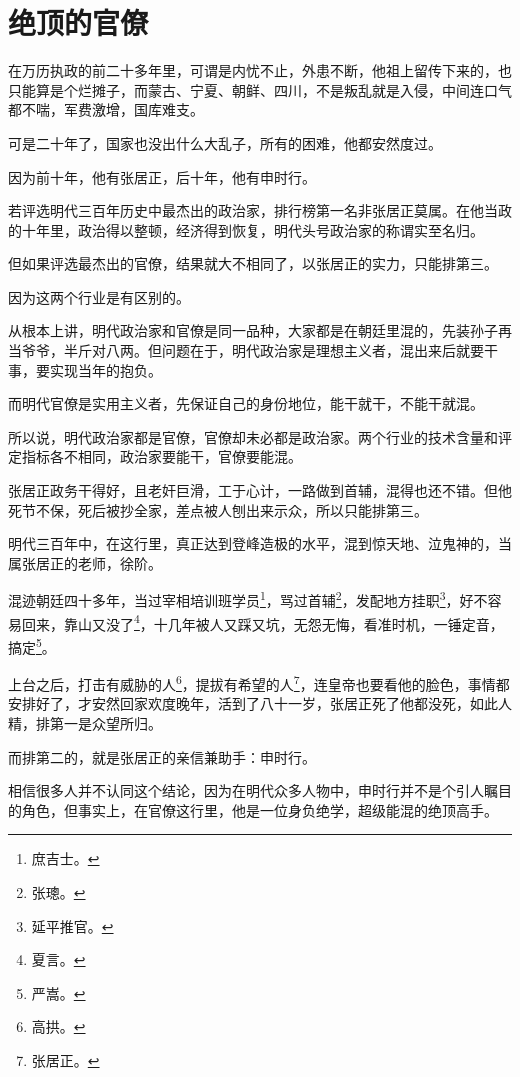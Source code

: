 \section{绝顶的官僚}
\ifnum{}
	\begin{multicols}{\theparacolNo}
		\fi
		在万历执政的前二十多年里，可谓是内忧不止，外患不断，他祖上留传下来的，也只能算是个烂摊子，而蒙古、宁夏、朝鲜、四川，不是叛乱就是入侵，中间连口气都不喘，军费激增，国库难支。

		可是二十年了，国家也没出什么大乱子，所有的困难，他都安然度过。

		因为前十年，他有张居正，后十年，他有申时行。

		若评选明代三百年历史中最杰出的政治家，排行榜第一名非张居正莫属。在他当政的十年里，政治得以整顿，经济得到恢复，明代头号政治家的称谓实至名归。

		但如果评选最杰出的官僚，结果就大不相同了，以张居正的实力，只能排第三。

		因为这两个行业是有区别的。

		从根本上讲，明代政治家和官僚是同一品种，大家都是在朝廷里混的，先装孙子再当爷爷，半斤对八两。但问题在于，明代政治家是理想主义者，混出来后就要干事，要实现当年的抱负。

		而明代官僚是实用主义者，先保证自己的身份地位，能干就干，不能干就混。

		所以说，明代政治家都是官僚，官僚却未必都是政治家。两个行业的技术含量和评定指标各不相同，政治家要能干，官僚要能混。

		张居正政务干得好，且老奸巨滑，工于心计，一路做到首辅，混得也还不错。但他死节不保，死后被抄全家，差点被人刨出来示众，所以只能排第三。

		明代三百年中，在这行里，真正达到登峰造极的水平，混到惊天地、泣鬼神的，当属张居正的老师，徐阶。

		混迹朝廷四十多年，当过宰相培训班学员\footnote{庶吉士。}，骂过首辅\footnote{张璁。}，发配地方挂职\footnote{延平推官。}，好不容易回来，靠山又没了\footnote{夏言。}，十几年被人又踩又坑，无怨无悔，看准时机，一锤定音，搞定\footnote{严嵩。}。

		上台之后，打击有威胁的人\footnote{高拱。}，提拔有希望的人\footnote{张居正。}，连皇帝也要看他的脸色，事情都安排好了，才安然回家欢度晚年，活到了八十一岁，张居正死了他都没死，如此人精，排第一是众望所归。

		而排第二的，就是张居正的亲信兼助手：申时行。

		相信很多人并不认同这个结论，因为在明代众多人物中，申时行并不是个引人瞩目的角色，但事实上，在官僚这行里，他是一位身负绝学，超级能混的绝顶高手。


\end{multicols}

